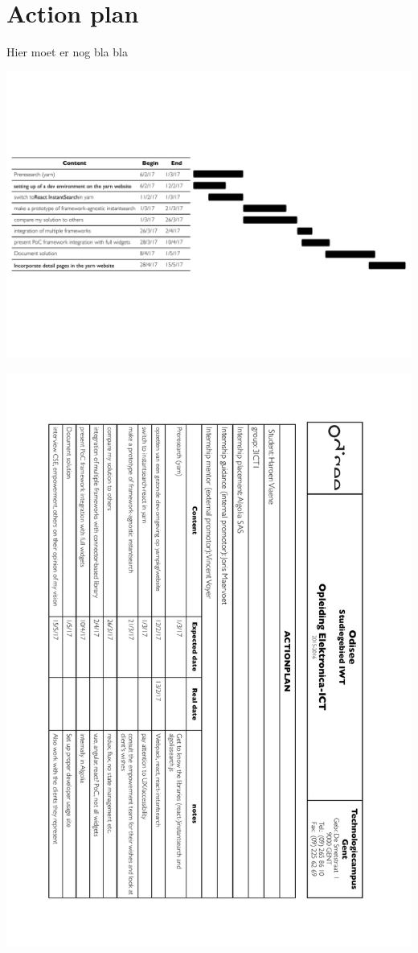 
\chapter{Action plan}
\label{chp:action_plan}

Hier moet er nog bla bla

\includegraphics[width=\textwidth]{../assets/action-plan-gantt.pdf}

\newpage

\includegraphics[width=\textwidth, height=0.95\textheight, keepaspectratio]{../assets/action-plan.pdf}
